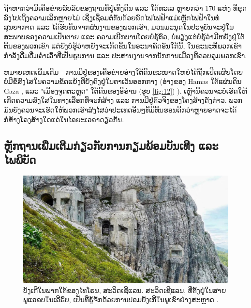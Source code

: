 \documentclass[10pt,twocolumn,letterpaper]{article}
\begin{document}
ຖ້າຫາກວ່າມີເຄືອຂ່າຍລັບລັບຂອງຖານທີ່ຢູ່ເທິງດິນ ແລະ ໃຕ້ທະເລ ຫຼາຍກວ່າ 170 ແຫ່ງ ທີ່ຂຸດລົງໄປເຖິງຄວາມເລິກຫຼາຍໄມ່ ເຊິ່ງເຊື່ອມຕໍ່ກັນດ້ວຍລົດໄຟໄຟຟ້າແມ່ເຫຼັກໄຟຟ້າໃນທໍ່ສູນຍາກາດ ແລະ ໄດ້ຮັບທຶນຈາກຜົນງານຂອງພວກເຮົາ, ມວນມະນຸດໃນປະຈຸບັນຈະຢູ່ໃນສະພາບຂອງຄວາມເປັນຕາຍ ແລະ ຄວາມເບີກບານໂດຍບໍ່ຮູ້ຕົວ, ບໍ່ພຽງແຕ່ບໍ່ຮູ້ວ່າມີຫຍັງຢູ່ໃຕ້ຕີນຂອງພວກເຂົາ ແຕ່ຍັງບໍ່ຮູ້ວ່າຫຍັງຈະເກີດຂຶ້ນໃນອະນາຄົດອັນໃກ້ນີ້, ໃນຂະນະທີ່ພວກເຂົາກຳລັງດື່ມດື່ມຄຳເວົ້າທີ່ເປັນຮູບການ ແລະ ປະສານງານຈາກນັກການເມືອງທີ່ຄວບຄຸມພວກເຂົາ.

ຫມາຍເຫດເພີ່ມເຕີມ - ການມີຢູ່ຂອງເຄືອຂ່າຍອ່າງໃຕ້ດິນຂະໜາດໃຫຍ່ໄດ້ຖືກເປີດເຜີຍໂດຍບໍ່ມີຂໍ້ສົງໄສໃນຄວາມຂັດແຍ້ງທີ່ຍັງຄົງຢູ່ໃນຕາເວັນອອກກາງ (ອ່າງຂອງ Hamas ໃຕ້ແຜ່ນດິນ Gaza \cite{38}, ແລະ "ເມືອງຈູດຕະຫຼດ" ໃຕ້ດິນຂອງອີຣ່ານ (ຮູບ \ref{fig:12}) \cite{39,40}). ເຫຼົ່ານີ້ຄວນຈະບໍ່ເຮັດໃຫ້ເກີດຄວາມສົງໃສໃນທາງເລືອກທີ່ຈະກໍ່ສ້າງ ແລະ ການມີຢູ່ຕົວຈິງຂອງໂຄງສ້າງດັ່ງກ່າວ. ພວກມັນຍັງຄວນຈະເຮັດໃຫ້ພວກເຮົາສົງໄສວ່າປະເທດອື່ນໆທີ່ມີທຶນຮອນດີກວ່າຫຼາຍອາດຈະໄດ້ກໍ່ສ້າງໂຄງສ້າງໃດແດ່ໃນໄລຍະເວລາດຽວກັນ.
\subsection{ຫຼັກຖານເພີ່ມເຕີມກ່ຽວກັບການກຽມພ້ອມບັນເທີງ ແລະ ໄພພິບັດ}

\begin{figure}[t]
\begin{center}
   \includegraphics[width=1\linewidth]{tyrol.jpg}
\end{center}
   \caption{ບັງເກີໃນພາກໃຕ້ຂອງໄທໂຣນ, ສະວິດເຊີແລນ. ສະວິດເຊີແລນ, ທີ່ຕັ້ງຢູ່ໃນສາຍພູແອລບໃນເອີຣົບ, ເປັນທີ່ຮູ້ຈັກດ້ວຍການປອມບັງເກີໃນພູເຂົາຢ່າງສະຫຼາດ \cite{32}.}
\label{fig:7}
\label{fig:onecol}
\end{figure}
\end{document}
